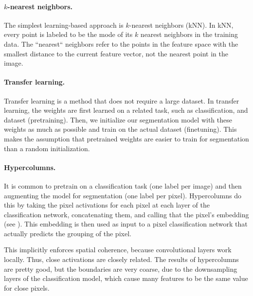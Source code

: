 \paragraph{$k$-nearest neighbors.}

The simplest learning-based approach is $k$-nearest neighbors (kNN). In kNN,
every point is labeled to be the mode of its $k$ nearest neighbors in the
training data. The ``nearest`` neighbors refer to the points in the feature
space with the smallest distance to the current feature vector, not the
nearest point in the image.

\paragraph{Transfer learning.}

Transfer learning is a method that does not require a large
dataset. In transfer learning, the weights are first learned on a
related task, such as classification, and dataset (pretraining). Then, we
initialize our segmentation model with these weights as much as possible and
train on the actual dataset (finetuning). This makes the assumption that
pretrained weights are easier to train for segmentation than a random
initialization.

\paragraph{Hypercolumns.}

It is common to pretrain on a classification task (one label per image) and
then augmenting the model for segmentation (one label per pixel). Hypercolumns
do this by taking the pixel activations for each pixel at each layer of the
classification network, concatenating them, and calling that the pixel's
embedding (see ). This
embedding is then used as input to a pixel classification network that actually
predicts the grouping of the pixel.

This implicitly enforces spatial coherence, because convolutional layers work
locally. Thus, close activations are closely related. The results of
hypercolumns are pretty good, but the boundaries are very coarse, due to the
downsampling layers of the classification model, which cause many features to
be the same value for close pixels.


